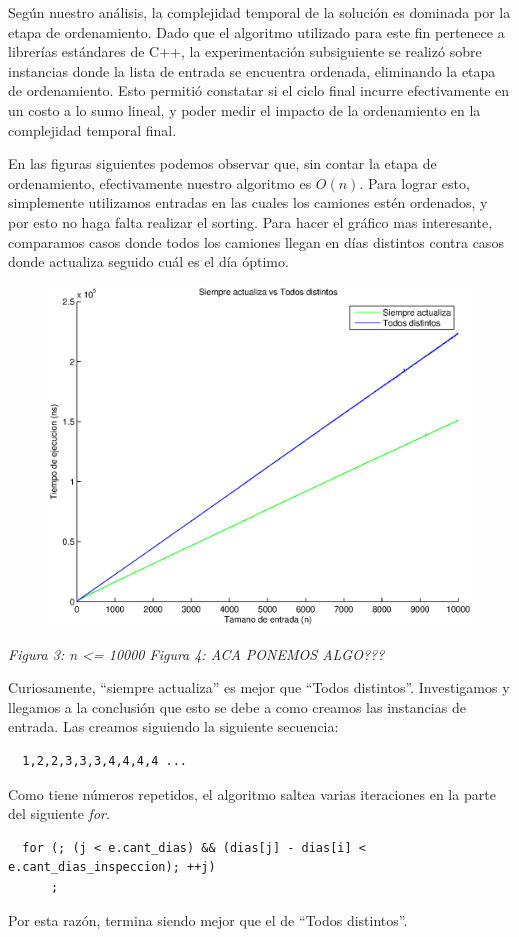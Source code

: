 Según nuestro análisis, la complejidad temporal de la solución es dominada por la etapa de ordenamiento. Dado que el algoritmo utilizado para este fin pertenece a librerías estándares de C++, la experimentación subsiguiente se realizó sobre instancias donde la lista de entrada se encuentra ordenada, eliminando la etapa de ordenamiento. Esto permitió constatar si el ciclo final incurre efectivamente en un costo a lo sumo lineal, y poder medir el impacto de la ordenamiento en la complejidad temporal final.

En las figuras siguientes podemos observar que, sin contar la etapa de ordenamiento, efectivamente nuestro algoritmo es $O(n)$. Para lograr esto, simplemente utilizamos entradas en las cuales los camiones estén ordenados, y por esto no haga falta realizar el sorting. Para hacer el gráfico mas interesante, comparamos casos donde todos los camiones llegan en días distintos contra casos donde actualiza seguido cuál es el día óptimo.

  \begin{figure}[H]
    \includegraphics[width=0.5\linewidth]{problema1/graficos/problema1_ordenada_siempre_actualiza_10000_vs_problema1_ordenada_todos_distintos_10000.eps}
\end{figure}
\emph{\hspace{2,5cm}Figura 3: n <= 10000 \hspace{3cm}Figura 4: ACA PONEMOS ALGO???}

Curiosamente, ``siempre actualiza'' es mejor que ``Todos distintos''. Investigamos y llegamos a la conclusión que esto se debe a como creamos las instancias de entrada. Las creamos siguiendo la siguiente secuencia:

\begin{verbatim}
  1,2,2,3,3,3,4,4,4,4 ...
\end{verbatim}

Como tiene números repetidos, el algoritmo saltea varias iteraciones en la parte del siguiente \emph{for}.

\begin{verbatim}
  for (; (j < e.cant_dias) && (dias[j] - dias[i] < e.cant_dias_inspeccion); ++j)
      ;
\end{verbatim}

Por esta razón, termina siendo mejor que el de ``Todos distintos''.
